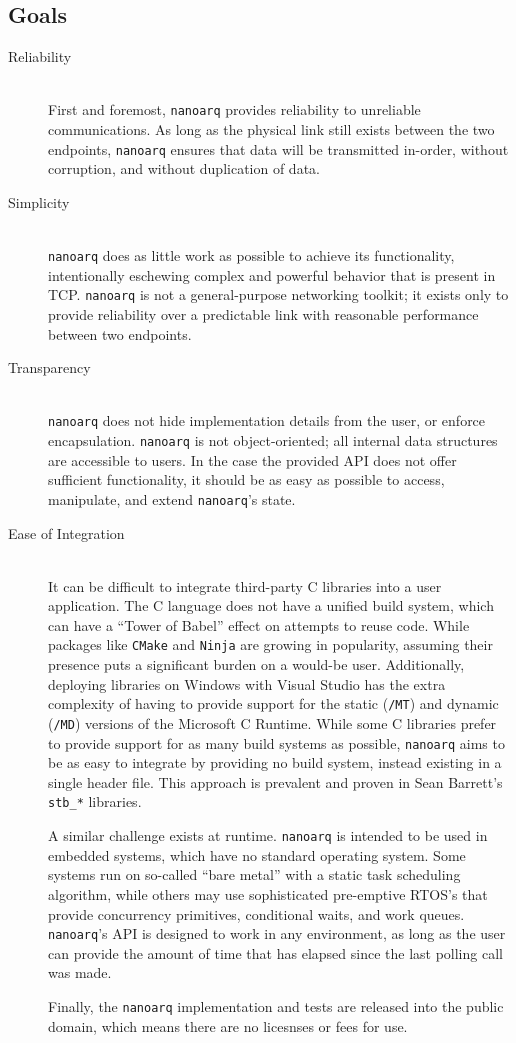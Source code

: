 \documentclass[11pt]{article}
\begin{document}
\subsection{Goals}
\begin{description}
    \item[Reliability] \hfill \\
        First and foremost, \texttt{nanoarq} provides reliability to unreliable communications. As long as the physical link still exists between the two endpoints, \texttt{nanoarq} ensures that data will be transmitted in-order, without corruption, and without duplication of data.
    \item[Simplicity] \hfill \\
        \texttt{nanoarq} does as little work as possible to achieve its functionality, intentionally eschewing complex and powerful behavior that is present in TCP. \texttt{nanoarq} is not a general-purpose networking toolkit; it exists only to provide reliability over a predictable link with reasonable performance between two endpoints.
    \item[Transparency] \hfill \\
        \texttt{nanoarq} does not hide implementation details from the user, or enforce encapsulation. \texttt{nanoarq} is not object-oriented; all internal data structures are accessible to users. In the case the provided API does not offer sufficient functionality, it should be as easy as possible to access, manipulate, and extend \texttt{nanoarq}'s state.
    \item[Ease of Integration] \hfill \\
        It can be difficult to integrate third-party C libraries into a user application. The C language does not have a unified build system, which can have a \enquote{Tower of Babel} effect on attempts to reuse code. While packages like \texttt{CMake} and \texttt{Ninja} are growing in popularity, assuming their presence puts a significant burden on a would-be user. Additionally, deploying libraries on Windows with Visual Studio has the extra complexity of having to provide support for the static (\texttt{/MT}) and dynamic (\texttt{/MD}) versions of the Microsoft C Runtime. While some C libraries prefer to provide support for as many build systems as possible, \texttt{nanoarq} aims to be as easy to integrate by providing no build system, instead existing in a single header file. This approach is prevalent and proven in Sean Barrett's \texttt{stb\_*} libraries. \par
        A similar challenge exists at runtime. \texttt{nanoarq} is intended to be used in embedded systems, which have no standard operating system. Some systems run on so-called \enquote{bare metal} with a static task scheduling algorithm, while others may use sophisticated pre-emptive RTOS's that provide concurrency primitives, conditional waits, and work queues. \texttt{nanoarq}'s API is designed to work in any environment, as long as the user can provide the amount of time that has elapsed since the last polling call was made. \par
        Finally, the \texttt{nanoarq} implementation and tests are released into the public domain, which means there are no licesnses or fees for use.
\end{description}
\end{document}
